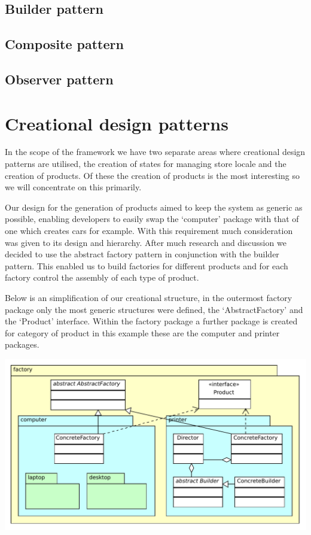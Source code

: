 \documentclass[pdftex,11pt,a4paper]{article}
\begin{document}
\subsection{Builder pattern}
\subsection{Composite pattern}
\subsection{Observer pattern}

\pagebreak
\section{Creational design patterns}
In the scope of the framework we have two separate areas where creational design patterns are utilised, the creation of states for managing store locale and the creation of products. Of these the creation of products is the most interesting so we will concentrate on this primarily.

Our design for the generation of products aimed to keep the system as generic as possible, enabling developers to easily swap the ‘computer’ package with that of one which creates cars for example. With this requirement much consideration was given to its design and hierarchy. After much research and discussion we decided to use the abstract factory pattern in conjunction with the builder pattern. This enabled us to build factories for different products and for each factory control the assembly of each type of product.

Below is an simplification of our creational structure, in the outermost factory package only the most generic structures were defined, the ‘AbstractFactory’ and the ‘Product’ interface. Within the factory package a further package is created for category of product in this example these are the computer and printer packages.

\begin{center}
	\includegraphics[scale=0.75]{images/creational_diagram.pdf}
\end{center}
\end{document}
